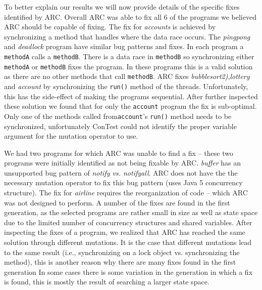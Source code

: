 
To better explain our results we will now provide details of the specific fixes identified by ARC. Overall ARC was able to fix all 6 of the programs we believed ARC should be capable of fixing. The fix for \textit{accounts} is achieved by synchronizing a method that handles where the data race occurs.  The \textit{pingpong} and
\textit{deadlock} program have similar bug patterns and fixes.  In each program
a \texttt{methodA} calls a \texttt{methodB}.  There is a data race in
\texttt{methodB} so synchronizing either \texttt{methodA} or \texttt{methodB}
fixes the program.  In these programs this is a valid solution as there are no
other methods that call \texttt{methodB}.  ARC fixes \textit{bubblesort2)},\textit{lottery} and \textit{account} by synchronizing the \texttt{run()} method of the threads.  Unfortunately, this has the side-effect of making the
programs sequential.  After further inspected these solution we found that for
only the \texttt{account} program the fix is sub-optimal.  Only one of the
methods called from\texttt{account}'s  \texttt{run()} method  needs to be
synchronized, unfortunately ConTest could not identify the proper variable
argument for the mutation operator to use.  

We had two programs for which ARC was unable to find a fix -- these two programs were initially identified as not being fixable by ARC. \textit{buffer} has an unsupported bug pattern of
\textit{notify vs. notifyall}. ARC does not have the the necessary mutation
operator to fix this bug pattern (uses Java 5 concurrency structure). The fix
for \textit{airline} requires the reorganization of code -- which ARC was not
designed to perform.  A number of the fixes are found in the first generation,
as the selected programs are rather small in size as well as state space due to
the limited number of concurrency structures and shared variables.  After
inspecting the fixes of a program, we realized that ARC has reached the same
solution through different mutations. It is the case that different mutations
lead to the same result (i.e., synchronizing on a lock object vs. synchronizing
the method), this is another reason why there are many fixes found in the first
generation  In  some cases there is some variation in the generation in which a
fix is found, this is mostly the result of searching a larger state space.
